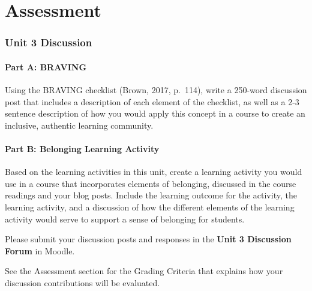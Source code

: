 \documentclass[
]{book}
\begin{document}
\hypertarget{assessment-2}{%
\section*{Assessment}\label{assessment-2}}

\begin{assessment}
\hypertarget{unit-3-discussion}{%
\subsubsection{Unit 3 Discussion}\label{unit-3-discussion}}

\hypertarget{part-a-braving}{%
\paragraph{Part A: BRAVING}\label{part-a-braving}}

Using the BRAVING checklist (Brown, 2017, p.~114), write a 250-word
discussion post that includes a description of each element of the
checklist, as well as a 2-3 sentence description of how you would apply
this concept in a course to create an inclusive, authentic learning
community.

\hypertarget{part-b-belonging-learning-activity}{%
\paragraph{Part B: Belonging Learning
Activity}\label{part-b-belonging-learning-activity}}

Based on the learning activities in this unit, create a learning
activity you would use in a course that incorporates elements of
belonging, discussed in the course readings and your blog posts. Include
the learning outcome for the activity, the learning activity, and a
discussion of how the different elements of the learning activity would
serve to support a sense of belonging for students.

Please submit your discussion posts and responses in the \textbf{Unit 3
Discussion Forum} in Moodle.

See the Assessment section for the Grading Criteria that explains how
your discussion contributions will be evaluated.
\end{assessment}
\end{document}
